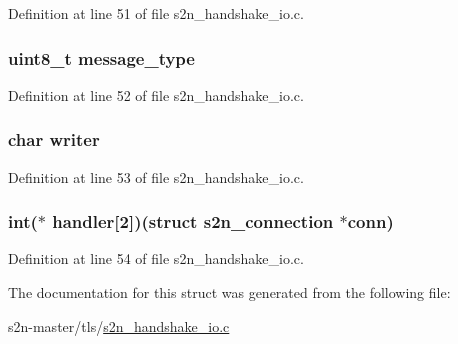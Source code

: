 Definition at line 51 of file s2n\+\_\+handshake\+\_\+io.\+c.

\subsubsection[{\texorpdfstring{message\+\_\+type}{message_type}}]{\setlength{\rightskip}{0pt plus 5cm}uint8\+\_\+t message\+\_\+type}\hypertarget{structs2n__handshake__action_aeaaffeace8c23899e558022f62ce6de4}{}\label{structs2n__handshake__action_aeaaffeace8c23899e558022f62ce6de4}


Definition at line 52 of file s2n\+\_\+handshake\+\_\+io.\+c.

\subsubsection[{\texorpdfstring{writer}{writer}}]{\setlength{\rightskip}{0pt plus 5cm}char writer}\hypertarget{structs2n__handshake__action_a2b7f5b7488391b0e62a33a69046f4ee5}{}\label{structs2n__handshake__action_a2b7f5b7488391b0e62a33a69046f4ee5}


Definition at line 53 of file s2n\+\_\+handshake\+\_\+io.\+c.

\subsubsection[{\texorpdfstring{handler}{handler}}]{\setlength{\rightskip}{0pt plus 5cm}int($\ast$ handler\mbox{[}2\mbox{]})(struct {\bf s2n\+\_\+connection} $\ast$conn)}\hypertarget{structs2n__handshake__action_a12cc0ccb2edb4b5554f5d618425e9e56}{}\label{structs2n__handshake__action_a12cc0ccb2edb4b5554f5d618425e9e56}


Definition at line 54 of file s2n\+\_\+handshake\+\_\+io.\+c.



The documentation for this struct was generated from the following file\+:\begin{DoxyCompactItemize}
\item 
s2n-\/master/tls/\hyperlink{s2n__handshake__io_8c}{s2n\+\_\+handshake\+\_\+io.\+c}\end{DoxyCompactItemize}
